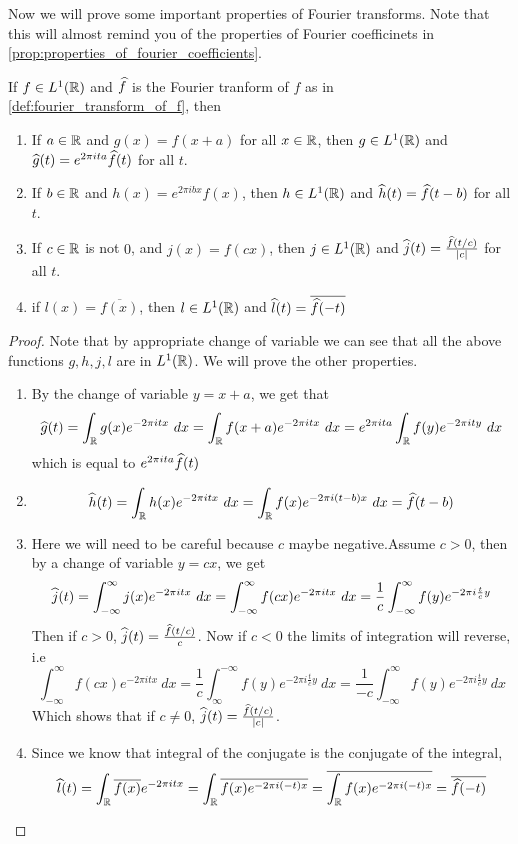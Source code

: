   Now we will prove some important properties of Fourier transforms. Note that this will almost remind you of the properties of Fourier coefficinets in \autoref{prop:properties_of_fourier_coefficients}. 
  \begin{proposition}
    \label{prop:properties_of_fourier_transform}
    If $f\in L^1(\mathbb R)$ and $\widehat{f}$ is the Fourier tranform of $f$ as in \autoref{def:fourier_transform_of_f}, then 
    \begin{enumerate}[label=(\alph*)]
      \item If $a \in \mathbb R$ and $g(x) = f(x+a)$ for all $x \in \mathbb R$, then $g \in L^1(\mathbb R)$ and $\widehat{g}(t) = e^{2\pi ita} \widehat{f}(t)$ for all $t$.
      \item If $b \in \mathbb R$ and $h(x) = e^{2\pi ibx}f(x)$, then $h \in L^1(\mathbb R)$ and $\widehat{h}(t) = \widehat{f}(t-b)$ for all $t$.
      \item If $c \in \mathbb R$ is not $0$, and $j(x) = f(cx)$, then $j \in L^1(\mathbb R)$ and $\widehat{j}(t) = \frac{\widehat{f}(t/c)}{|c|}$ for all $t$.
      \item if $l(x) = \overline{f(x)}$, then $l\in L^1(\mathbb R)$ and $\widehat{l}(t) = \overline{\widehat{f}(-t)}$
    \end{enumerate}
  \end{proposition}

  \begin{proof}
    Note that by appropriate change of variable we can see that all the above functions $g, h, j, l$ are in $L^1(\mathbb R)$. We will prove the other properties.
    \begin{enumerate}[label=(\alph*)]
      \item By the change of variable $y = x+a$, we get that
        $$\widehat{g}(t) = \int_{\mathbb R}g(x)e^{-2 \pi itx} \ dx = \int_\mathbb R f(x+a)e^{-2\pi itx} \ dx = e^{2\pi ita}\int_\mathbb R f(y)e^{-2 \pi ity} \ dx$$
        which is equal to $e^{2\pi ita}\widehat{f}(t)$

      \item $$\widehat{h}(t) = \int_{\mathbb R}h(x)e^{-2\pi itx} \ dx = \int_\mathbb R f(x)e^{-2\pi i(t-b)x} \ dx = \widehat{f}(t-b)$$

      \item Here we will need to be careful because $c$ maybe negative.Assume $c>0$, then by a change of variable $y=cx$, we get $$\widehat{j}(t) = \int_{-\infty}^{\infty} j(x)e^{-2\pi itx} \ dx = \int_{-\infty}^{\infty} f(cx)e^{-2\pi itx} \ dx = \frac{1}{c}\int_{-\infty}^{\infty} f(y)e^{-2\pi i \frac{t}{c}y} $$
        Then if $c>0$, $\widehat{j}(t) = \frac{\widehat{f}(t/c)}{c}$. Now if $c<0$ the limits of integration will reverse, i.e $$\int_{-\infty}^{\infty} f(cx)e^{-2\pi itx} \ dx = \frac{1}{c}\int_{\infty}^{-\infty} f(y)e^{-2\pi i \frac{t}{c}y} \ dx = \frac{1}{-c}\int_{-\infty}^{\infty} f(y)e^{-2\pi i \frac{t}{c}y} \ dx$$
        Which shows that if $c\neq 0$, $\widehat{j}(t) = \frac{\widehat{f}(t/c)}{|c|}$.
      \item Since we know that integral of the conjugate is the conjugate of the integral, $$\widehat{l}(t) = \int_\mathbb R \overline{f(x)} e^{-2\pi itx} = \int_\mathbb R \overline{f(x) e^{-2\pi i(-t)x}} = \overline{\int_\mathbb R f(x) e^{-2\pi i(-t)x}} = \overline{\widehat{f}(-t)}$$
    \end{enumerate}
  \end{proof}

